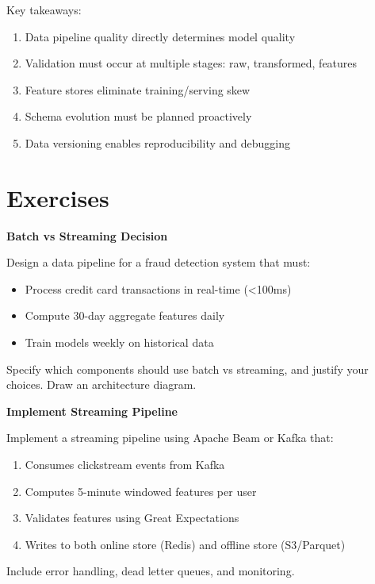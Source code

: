 Key takeaways:
\begin{enumerate}
    \item Data pipeline quality directly determines model quality
    \item Validation must occur at multiple stages: raw, transformed, features
    \item Feature stores eliminate training/serving skew
    \item Schema evolution must be planned proactively
    \item Data versioning enables reproducibility and debugging
\end{enumerate}

\section{Exercises}

\begin{exercise}
\textbf{Batch vs Streaming Decision}

Design a data pipeline for a fraud detection system that must:
\begin{itemize}
    \item Process credit card transactions in real-time (<100ms)
    \item Compute 30-day aggregate features daily
    \item Train models weekly on historical data
\end{itemize}

Specify which components should use batch vs streaming, and justify your choices. Draw an architecture diagram.
\end{exercise}

\begin{exercise}
\textbf{Implement Streaming Pipeline}

Implement a streaming pipeline using Apache Beam or Kafka that:
\begin{enumerate}
    \item Consumes clickstream events from Kafka
    \item Computes 5-minute windowed features per user
    \item Validates features using Great Expectations
    \item Writes to both online store (Redis) and offline store (S3/Parquet)
\end{enumerate}

Include error handling, dead letter queues, and monitoring.
\end{exercise}

